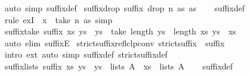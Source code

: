 \begin{isabellebody}
%
\isadelimproof
%
\endisadelimproof
%
\isatagproof
{}\isamarkupfalse%
\ {\isacharparenleft}auto\ simp{\isacharcolon}\ suffix{\isacharunderscore}def{\isacharparenright}%
\endisatagproof
{\isafoldproof}%
%
\isadelimproof
\isanewline
%
\endisadelimproof
\isanewline
{}\isamarkupfalse%
\ suffix{\isacharunderscore}drop{\isacharcolon}\ {\isachardoublequoteopen}suffix\ {\isacharparenleft}drop\ n\ as{\isacharparenright}\ as{\isachardoublequoteclose}\isanewline
%
\isadelimproof
\ \ %
\endisadelimproof
%
\isatagproof
{}\isamarkupfalse%
\ suffix{\isacharunderscore}def\ \isamarkupfalse%
\ {\isacharparenleft}rule\ exI\ {\isacharbrackleft}\ x\ {\isacharequal}\ {\isachardoublequoteopen}take\ n\ as{\isachardoublequoteclose}{\isacharbrackright}{\isacharparenright}\ simp%
\endisatagproof
{\isafoldproof}%
%
\isadelimproof
\isanewline
%
\endisadelimproof
\isanewline
{}\isamarkupfalse%
\ suffix{\isacharunderscore}take{\isacharcolon}\ {\isachardoublequoteopen}suffix\ xs\ ys\ {\isasymLongrightarrow}\ ys\ {\isacharequal}\ take\ {\isacharparenleft}length\ ys\ {\isacharminus}\ length\ xs{\isacharparenright}\ ys\ {\isacharat}\ xs{\isachardoublequoteclose}\isanewline
%
\isadelimproof
\ \ %
\endisadelimproof
%
\isatagproof
{}\isamarkupfalse%
\ {\isacharparenleft}auto\ elim{\isacharbang}{\isacharcolon}\ suffixE{\isacharparenright}%
\endisatagproof
{\isafoldproof}%
%
\isadelimproof
\isanewline
%
\endisadelimproof
\isanewline
{}\isamarkupfalse%
\ strict{\isacharunderscore}suffix{\isacharunderscore}reflclp{\isacharunderscore}conv{\isacharcolon}\ {\isachardoublequoteopen}strict{\isacharunderscore}suffix\isactrlsup {\isacharequal}\isactrlsup {\isacharequal}\ {\isacharequal}\ suffix{\isachardoublequoteclose}\isanewline
%
\isadelimproof
\ \ %
\endisadelimproof
%
\isatagproof
{}\isamarkupfalse%
\ {\isacharparenleft}intro\ ext{\isacharparenright}\ {\isacharparenleft}auto\ simp{\isacharcolon}\ suffix{\isacharunderscore}def\ strict{\isacharunderscore}suffix{\isacharunderscore}def{\isacharparenright}%
\endisatagproof
{\isafoldproof}%
%
\isadelimproof
\isanewline
%
\endisadelimproof
\isanewline
{}\isamarkupfalse%
\ suffix{\isacharunderscore}lists{\isacharcolon}\ {\isachardoublequoteopen}suffix\ xs\ ys\ {\isasymLongrightarrow}\ ys\ {\isasymin}\ lists\ A\ {\isasymLongrightarrow}\ xs\ {\isasymin}\ lists\ A{\isachardoublequoteclose}\isanewline
%
\isadelimproof
\ \ %
\endisadelimproof
%
\isatagproof
{}\isamarkupfalse%
\ suffix{\isacharunderscore}def\ \isamarkupfalse%

\end{isabellebody}
